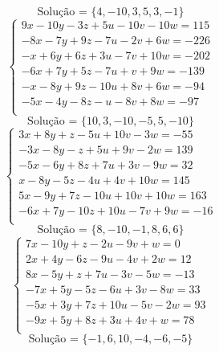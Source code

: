 \documentclass[12pt,oneside,a4paper]{article}
\begin{document}
\begin{equation*}
\text{Solução = }\{4,-10,3,5,3,-1\}
\end{equation*}
\vspace{\baselineskip}
\begin{equation*}
\begin{cases}
9x-10y-3z+5u-10v-10w=115 \\
-8x-7y+9z-7u-2v+6w=-226 \\
-x+6y+6z+3u-7v+10w=-202 \\
-6x+7y+5z-7u+v+9w=-139 \\
-x-8y+9z-10u+8v+6w=-94 \\
-5x-4y-8z-u-8v+8w=-97 \\
\end{cases}
\end{equation*}
\begin{equation*}
\text{Solução = }\{10,3,-10,-5,5,-10\}
\end{equation*}
\vspace{\baselineskip}
\begin{equation*}
\begin{cases}
3x+8y+z-5u+10v-3w=-55 \\
-3x-8y-z+5u+9v-2w=139 \\
-5x-6y+8z+7u+3v-9w=32 \\
x-8y-5z-4u+4v+10w=145 \\
5x-9y+7z-10u+10v+10w=163 \\
-6x+7y-10z+10u-7v+9w=-16 \\
\end{cases}
\end{equation*}
\begin{equation*}
\text{Solução = }\{8,-10,-1,8,6,6\}
\end{equation*}
\vspace{\baselineskip}
\begin{equation*}
\begin{cases}
7x-10y+z-2u-9v+w=0 \\
2x+4y-6z-9u-4v+2w=12 \\
8x-5y+z+7u-3v-5w=-13 \\
-7x+5y-5z-6u+3v-8w=33 \\
-5x+3y+7z+10u-5v-2w=93 \\
-9x+5y+8z+3u+4v+w=78 \\
\end{cases}
\end{equation*}
\begin{equation*}
\text{Solução = }\{-1,6,10,-4,-6,-5\}
\end{equation*}
\end{document}
